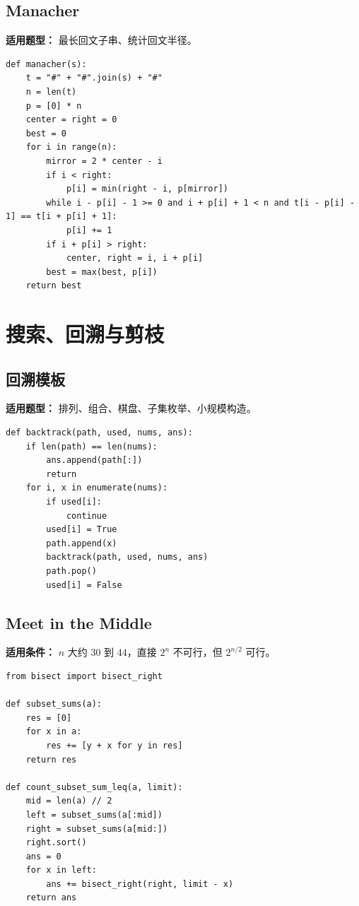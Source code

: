 \documentclass[UTF8,a4paper,14pt]{ctexart}
\begin{document}
\subsection{Manacher}

\textbf{适用题型：}
最长回文子串、统计回文半径。

\begin{lstlisting}
def manacher(s):
    t = "#" + "#".join(s) + "#"
    n = len(t)
    p = [0] * n
    center = right = 0
    best = 0
    for i in range(n):
        mirror = 2 * center - i
        if i < right:
            p[i] = min(right - i, p[mirror])
        while i - p[i] - 1 >= 0 and i + p[i] + 1 < n and t[i - p[i] - 1] == t[i + p[i] + 1]:
            p[i] += 1
        if i + p[i] > right:
            center, right = i, i + p[i]
        best = max(best, p[i])
    return best
\end{lstlisting}

\section{搜索、回溯与剪枝}

\subsection{回溯模板}

\textbf{适用题型：}
排列、组合、棋盘、子集枚举、小规模构造。

\begin{lstlisting}
def backtrack(path, used, nums, ans):
    if len(path) == len(nums):
        ans.append(path[:])
        return
    for i, x in enumerate(nums):
        if used[i]:
            continue
        used[i] = True
        path.append(x)
        backtrack(path, used, nums, ans)
        path.pop()
        used[i] = False
\end{lstlisting}

\subsection{Meet in the Middle}

\textbf{适用条件：}
$n$ 大约 $30$ 到 $44$，直接 $2^n$ 不可行，但 $2^{n/2}$ 可行。

\begin{lstlisting}
from bisect import bisect_right

def subset_sums(a):
    res = [0]
    for x in a:
        res += [y + x for y in res]
    return res

def count_subset_sum_leq(a, limit):
    mid = len(a) // 2
    left = subset_sums(a[:mid])
    right = subset_sums(a[mid:])
    right.sort()
    ans = 0
    for x in left:
        ans += bisect_right(right, limit - x)
    return ans
\end{lstlisting}
\end{document}
